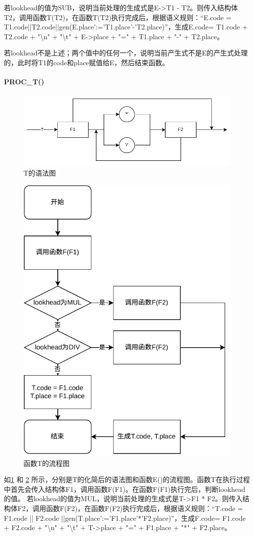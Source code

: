 \documentclass{ctexrep}
\begin{document}
若lookhead的值为SUB，说明当前处理的生成式是E->T1 - T2。则传入结构体T2，调用函数T(T2)，在函数T(T2)执行完成后，根据语义规则：“E.code = T1.code||T2.code||gen(E.place’:=’T1.place’-’T2.place)”，生成E.code= T1.code + T2.code + "\textbackslash{}n" + "\textbackslash{}t" + E->place + "=" + T1.place + "-" + T2.place。

若lookhead不是上述；两个值中的任何一个，说明当前产生式不是E的产生式处理的，此时将T1的code和place赋值给E，然后结束函数。

\paragraph{PROC\_T()}
\begin{figure}
    \centering
    \includegraphics[width = .8\linewidth]{t.drawio.pdf}
    \caption{T的语法图}
    \label{fig:t}
\end{figure}
\begin{figure}
    \centering
    \includegraphics[width = .4\linewidth]{001T.drawio.png.pdf}
    \caption{函数T的流程图}
    \label{fig:proc-t}
\end{figure}
如\cref{fig:t} 和 \cref{fig:proc-t} 所示，分别是T的化简后的语法图和函数E()的流程图。函数T在执行过程中首先会传入结构体F1，调用函数F(F1)。在函数F(F1)执行完后，判断lookhead的值。
若lookhead的值为MUL，说明当前处理的生成式是T->F1 * F2。则传入结构体F2，调用函数F(F2)，在函数F(F2)执行完成后，根据语义规则：“T.code = F1.code || F2.code ||gen(T.place’:=’F1.place’*’F2.place)”，生成F.code= F1.code + F2.code + "\textbackslash{}n" + "\textbackslash{}t" + T->place + "=" + F1.place + "*" + F2.place。
\end{document}
